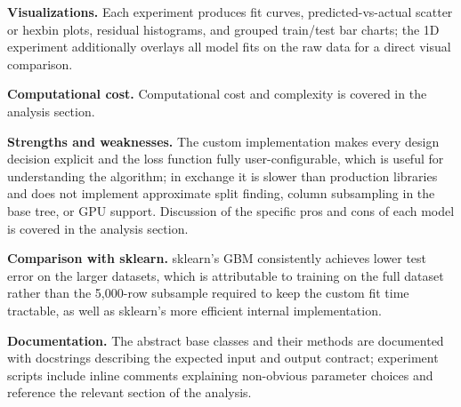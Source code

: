 \documentclass[a4paper, 11pt]{article}
\begin{document}
\textbf{Visualizations.} Each experiment produces fit curves,
predicted-vs-actual scatter or hexbin plots, residual histograms, and
grouped train/test bar charts; the 1D experiment additionally overlays
all model fits on the raw data for a direct visual comparison.

\textbf{Computational cost.} Computational cost and complexity is
covered in the analysis section.

\textbf{Strengths and weaknesses.} The custom implementation makes every
design decision explicit and the loss function fully user-configurable,
which is useful for understanding the algorithm; in exchange it is slower
than production libraries and does not implement approximate split
finding, column subsampling in the base tree, or GPU support.
Discussion of the specific pros and cons of each model is covered in
the analysis section.

\textbf{Comparison with sklearn.} sklearn's GBM consistently achieves
lower test error on the larger datasets, which is attributable to
training on the full dataset rather than the 5,000-row subsample
required to keep the custom fit time tractable, as well as sklearn's
more efficient internal implementation.

\textbf{Documentation.} The abstract base classes and their methods are
documented with docstrings describing the expected input and output
contract; experiment scripts include inline comments explaining
non-obvious parameter choices and reference the relevant section of the
analysis.


\end{document}
